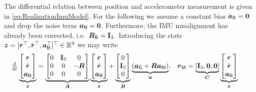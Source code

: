 The differential relation between position and accelerometer measurement is given in \eqref{eq:RealizationImuModel}. 
For the following we assume a constant bias $\aIMUBd = \tuple{0}$ and drop the noise term $\aIMUN = \tuple{0}$.
Furthermore, the IMU misalignment has already been corrected, i.e.\ $\RIMUBR = \idMat[3]$.
Introducing the state $\tuple{z} = [\r^\top, \rd^\top, \aIMUB^\top]^\top \in \RealNum^9$ we may write 
\begin{align}\label{eq:AccelerometerDynamicsState}
 \tdiff{t}
 \underbrace{\begin{bmatrix} \r \\ \rd \\ \aIMUB \end{bmatrix}}_{\tuple{z}}
 &=
 \underbrace{\begin{bmatrix} 0 & \idMat[3] & 0 \\ 0 & 0 & -\R \\ 0 & 0 & 0 \end{bmatrix}}_{\mat{A}}
 \underbrace{\begin{bmatrix} \r \\ \rd \\ \aIMUB \end{bmatrix}}_{\tuple{z}}
 +
 \underbrace{\begin{bmatrix} 0 \\ \idMat[3] \\ 0 \end{bmatrix}}_{\mat{B}}
 \underbrace{(\gravityAcc + \R \aIMU)}_{\tuple{u}},&
 \rVIC &= \underbrace{[\idMat[3], \mat{0}, \mat{0}]}_{\mat{C}}
 \underbrace{\begin{bmatrix} \r \\ \rd \\ \aIMUB \end{bmatrix}}_{\tuple{z}}
\end{align}

